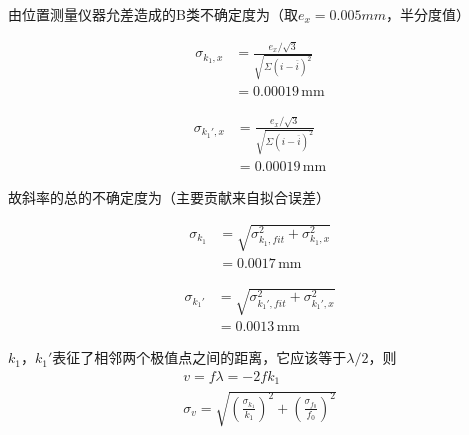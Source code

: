 \documentclass[10pt, twocolumn]{article}
\begin{document}
\par 
由位置测量仪器允差造成的B类不确定度为（取$e_x=0.005mm$，半分度值）\\
\begin{minipage}{0.23\textwidth}
\begin{equation*}
    \begin{aligned}
        \sigma_{k_1,x} &= \frac{e_x/\sqrt{3}}{\sqrt{\Sigma(i-\overline{i})^2}} \\
        &= 0.00019\,\text{mm}
    \end{aligned}
\end{equation*}
\end{minipage}
\begin{minipage}{0.23\textwidth}
\begin{equation*}
    \begin{aligned}
        \sigma_{k_1',x} &= \frac{e_x/\sqrt{3}}{\sqrt{\Sigma(i-\overline{i})^2}} \\
        &= 0.00019\,\text{mm}
    \end{aligned}
\end{equation*}
\end{minipage}
\par
故斜率的总的不确定度为（主要贡献来自拟合误差）\\
\begin{minipage}{0.23\textwidth}
\begin{equation*}
    \begin{aligned}
        \sigma_{k_1} &= \sqrt{\sigma_{k_1,fit}^2+\sigma_{k_1,x}^2} \\
        &= 0.0017\,\text{mm}
    \end{aligned}
\end{equation*}
\end{minipage}
\begin{minipage}{0.23\textwidth}
\begin{equation*}
    \begin{aligned}
        \sigma_{k_1'} &= \sqrt{\sigma_{k_1',fit}^2+\sigma_{k_1',x}^2} \\
        &= 0.0013\,\text{mm}
    \end{aligned}
\end{equation*}
\end{minipage}
\par 
$k_1$，$k_1'$表征了相邻两个极值点之间的距离，它应该等于$\lambda/2$，则\\
\[
\begin{aligned} 
    v=f\lambda=-2fk_1 \\
    \sigma_v=\sqrt{(\frac{\sigma_{k_1}}{k_1})^2+(\frac{\sigma_{f_0}}{f_0})^2}
\end{aligned}
\]
\end{document}
